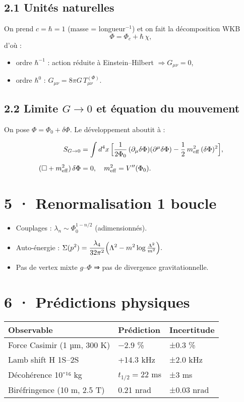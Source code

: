 \documentclass[11pt]{article}
\begin{document}
\subsection*{2.1 Unités naturelles}
On prend $c=\hbar=1$ (masse = longueur$^{-1}$) et on fait la décomposition WKB
\[
  \Phi=\Phi_c+\hbar\,\chi,
\]
d’où :
\begin{itemize}
  \item ordre $\hbar^{-1}$ : action réduite à Einstein–Hilbert $\Rightarrow G_{\mu\nu}=0$,
  \item ordre $\hbar^0$ : $G_{\mu\nu}=8\pi G\,T_{\mu\nu}^{(\Phi)}$.
\end{itemize}

\subsection*{2.2 Limite $G\to0$ et équation du mouvement}
On pose $\Phi=\Phi_0+\delta\Phi$. Le développement aboutit à :

\begin{align*}
  S_{G\to 0}
  &= \int d^{4}x\,
     \Bigl[
       \frac{1}{2\Phi_{0}}\,
       (\partial_\mu\delta\Phi)(\partial^\mu\delta\Phi)
       - \frac{1}{2}\,m_{\mathrm{eff}}^{2}\,(\delta\Phi)^{2}
     \Bigr], \\[0.6em]
  (\Box + m_{\mathrm{eff}}^{2})\,\delta\Phi
  &= 0,
  \quad
  m_{\mathrm{eff}}^{2}=V''(\Phi_{0}).
\end{align*}

\section{5 · Renormalisation 1 boucle}
\begin{itemize}
  \item Couplages : $\lambda_n\sim\Phi_0^{1-n/2}$ (adimensionnés).
  \item Auto-énergie : $\displaystyle
        \Sigma(p^2)
        = \frac{\lambda_4}{32\pi^2}
          \Bigl(\Lambda^2 - m^2\log\tfrac{\Lambda^2}{m^2}\Bigr).
  $
  \item Pas de vertex mixte $g$–$\Phi$ ⇒ pas de divergence gravitationnelle.
\end{itemize}

\section{6 · Prédictions physiques}
\begin{center}
\begin{tabular}{|l|l|l|}
\hline
Observable & Prédiction & Incertitude\\\hline
Force Casimir (1 µm, 300 K) & −2.9 \%   & ±0.3 \%\\
Lamb shift H 1S–2S          & +14.3 kHz & ±2.0 kHz\\
Décohérence 10⁻¹⁶ kg        & $t_{1/2}=22$ ms & ±3 ms\\
Biréfringence (10 m, 2.5 T) & 0.21 nrad & ±0.03 nrad\\\hline
\end{tabular}
\end{center}
\end{document}
